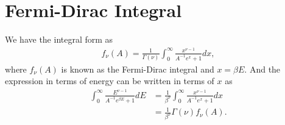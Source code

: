 \documentclass[%
 reprint,
 amsmath,amssymb,
 aps,
]{revtex4-2}
\newcommand{\nn}{\nonumber}
\begin{document}
    \section{Fermi-Dirac Integral}
    \label{App_B}
    We have the integral form as
    \begin{align}
        f_\nu (A)=\frac{1}{\Gamma (\nu)}\int_0^\infty \frac{x^{\nu-1}}{A^{-1} e^x+1} dx,
        \label{mom}
    \end{align}
    where $f_\nu (A)$ is known as the Fermi-Dirac integral and $x= \beta E$. And the expression in terms of energy can be written in terms of $x$ as
    \begin{align}
        \int_{0}^{\infty}  \frac{E^{\nu -1}}{A^{-1}e^{\beta E} + 1} dE &= \frac{1}{\beta^\nu} \int_0^\infty \frac{x^{\nu-1}}{A^{-1} e^x+1} dx\nn\\
        &= \frac{1}{\beta^\nu} \Gamma (\nu)  f_\nu (A).
    \end{align}
%
%
%
\end{document}
